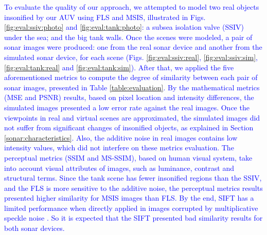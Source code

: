\documentclass[final,5p,times]{elsarticle}
\begin{document}
\textcolor{blue}{To evaluate the quality of our approach, we attempted to model two real objects insonified by our AUV using FLS and MSIS, illustrated in Figs. \ref{fig:eval:ssiv:photo} and \ref{fig:eval:tank:photo}: a subsea isolation valve (SSIV) under the sea; and the big tank walls. Once the scenes were modeled, a pair of sonar images were produced: one from the real sonar device and another from the simulated sonar device, for each scene (Figs. \ref{fig:eval:ssiv:real}, \ref{fig:eval:ssiv:sim}, \ref{fig:eval:tank:real} and \ref{fig:eval:tank:sim}). After that, we applied the five aforementioned metrics to compute the degree of similarity between each pair of sonar images, presented in Table \ref{table:evaluation}. By the mathematical metrics (MSE and PSNR) results, based on pixel location and intensity differences, the simulated images presented a low error rate against the real images. Once the viewpoints in real and virtual scenes are approximated, the simulated images did not suffer from significant changes of insonified objects, as explained in Section \ref{sonar:characteristics}. Also, the additive noise in real images contains low intensity values, which did not interfere on these metrics evaluation. The perceptual metrics (SSIM and MS-SSIM), based on human visual system, take into account visual attributes of images, such as luminance, contrast and structural terms. Since the tank scene has fewer insonified regions than the SSIV, and the FLS is more sensitive to the additive noise, the perceptual metrics results presented higher similarity for MSIS images than FLS. By the end, SIFT has a limited performance when directly applied in images corrupted by multiplicative speckle noise \cite{suganya2016}. So it is expected that the SIFT presented bad similarity results for both sonar devices.}
\end{document}
